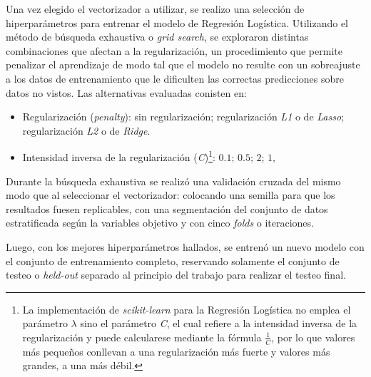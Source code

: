 Una vez elegido el vectorizador a utilizar, se realizo una selección
de hiperparámetros para entrenar el modelo de Regresión Logística.
Utilizando el método de búsqueda exhaustiva o \textit{grid search}, se
exploraron distintas combinaciones que afectan a la regularización,
un procedimiento que permite penalizar el aprendizaje de modo tal que
el modelo no resulte con un sobreajuste a los datos de entrenamiento que
le dificulten las correctas predicciones sobre datos no vistos. Las
alternativas evaluadas conisten en:

\begin{itemize}
    \item Regularización (\textit{penalty}): sin regularización; regularización \textit{L1}
    o de \textit{Lasso}; regularización \textit{L2} o de \textit{Ridge}.
    \item Intensidad inversa de la regularización (\textit{C})\footnote{
    La implementación de \textit{scikit-learn} para la Regresión
    Logística no emplea el parámetro $\lambda$ sino el parámetro \textit{C},
    el cual refiere a la intensidad inversa de la regularización y puede
    calcularese mediante la fórmula $\frac{1}{C}$, por lo que valores
    más pequeños conllevan a una regularización más fuerte y valores más
    grandes, a una más débil.}: $0.1$; $0.5$; $2$; $1$,
\end{itemize}

Durante la búsqueda exhaustiva se realizó una validación cruzada del mismo
modo que al seleccionar el vectorizador: colocando una semilla para que los
resultados fuesen replicables, con una segmentación del conjunto de datos
estratificada según la variables objetivo y con cinco \textit{folds} o
iteraciones.
\par
Luego, con los mejores hiperparámetros hallados, se entrenó un nuevo modelo
con el conjunto de entrenamiento completo, reservando solamente el
conjunto de testeo o \textit{held-out} separado al principio del trabajo
para realizar el testeo final.
